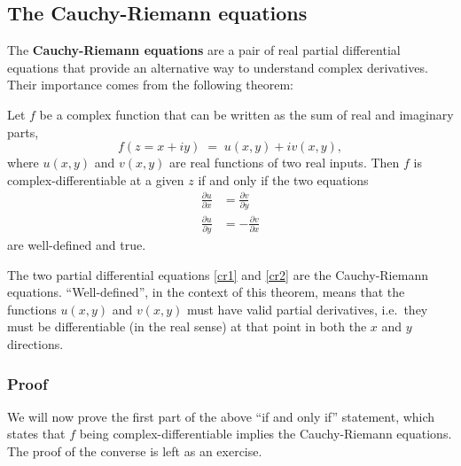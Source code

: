 \documentclass[10pt,a4paper]{article}
\begin{document}
\subsection{The Cauchy-Riemann equations}
\label{cauchy-riemann-equations}

The \textbf{Cauchy-Riemann equations} are a pair of real partial
differential equations that provide an alternative way to understand
complex derivatives. Their importance comes from the following
theorem:

\begin{framed}\noindent
Let $f$ be a complex function that can be written as the sum of real
and imaginary parts, \[f(z = x + iy) \;=\; u(x,y) + i v(x,y),\] where
$u(x,y)$ and $v(x,y)$ are real functions of two real inputs. Then
$f$ is complex-differentiable at a given $z$ if and only if the
two equations
\begin{align}
  \frac{\partial u}{\partial x} &= \frac{\partial v}{\partial y} \label{cr1}\\
  \frac{\partial u}{\partial y} &= -\frac{\partial v}{\partial x} \label{cr2}
\end{align}
are well-defined and true.
\end{framed}

\noindent
The two partial differential equations \eqref{cr1} and \eqref{cr2} are
the Cauchy-Riemann equations. ``Well-defined'', in the context of this
theorem, means that the functions $u(x,y)$ and $v(x,y)$ must have
valid partial derivatives, i.e.~they must be differentiable (in the
real sense) at that point in both the $x$ and $y$ directions.

\subsubsection{Proof}
\label{proof}

We will now prove the first part of the above ``if and only if''
statement, which states that $f$ being complex-differentiable implies
the Cauchy-Riemann equations. The proof of the converse is left as an
exercise.
\end{document}
